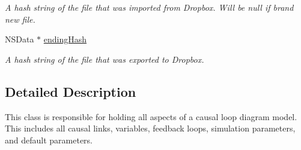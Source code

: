 \begin{DoxyCompactItemize}
\begin{DoxyCompactList}\small\item\em A hash string of the file that was imported from Dropbox. Will be null if brand new file. \end{DoxyCompactList}\item 
\hypertarget{interface_model_a3a3aa4972b9e878cf839228535944a82}{N\-S\-Data $\ast$ \hyperlink{interface_model_a3a3aa4972b9e878cf839228535944a82}{ending\-Hash}}\label{interface_model_a3a3aa4972b9e878cf839228535944a82}

\begin{DoxyCompactList}\small\item\em A hash string of the file that was exported to Dropbox. \end{DoxyCompactList}\end{DoxyCompactItemize}


\subsection{Detailed Description}
This class is responsible for holding all aspects of a causal loop diagram model. This includes all causal links, variables, feedback loops, simulation parameters, and default parameters. 

